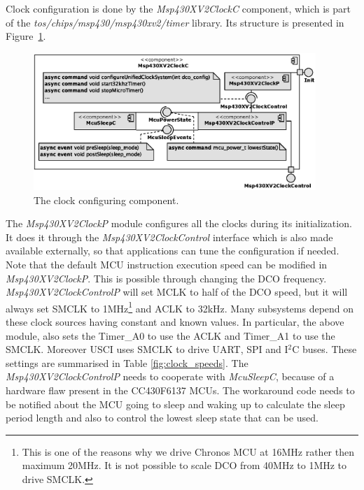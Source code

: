 Clock configuration is done by the \emph{Msp430XV2ClockC} component, which is part of the \emph{tos/chips/msp430/msp430xv2/timer} library. Its structure is presented in Figure~\ref{fig:Msp430XV2ClockC}.
\begin{figure}[h]
  \centering
  \includegraphics[width=0.95\textwidth]{diagrams/Msp430XV2ClockC.eps}
  \caption{The clock configuring component.}
  \label{fig:Msp430XV2ClockC}
\end{figure}
The \emph{Msp430XV2ClockP} module configures all the clocks during its initialization. It does it through the \emph{Msp430XV2ClockControl} interface which is also made available externally, so that applications can tune the configuration if needed. Note that the default MCU instruction execution speed can be modified in \emph{Msp430XV2ClockP}. This is possible through changing the DCO frequency. \emph{Msp430XV2ClockControlP} will set MCLK to half of the DCO speed, but it will always set SMCLK to 1MHz\footnote{This is one of the reasons why we drive Chronos MCU at 16MHz rather then maximum 20MHz. It is not possible to scale DCO from 40MHz to 1MHz to drive SMCLK.} and ACLK to 32kHz. Many subsystems depend on these clock sources having constant and known values. In particular, the above module, also sets the Timer\_A0 to use the ACLK and Timer\_A1 to use the SMCLK. Moreover USCI uses SMCLK to drive UART, SPI and I$^2$C buses. These settings are summarised in Table \ref{fig:clock_speeds}.
The \emph{Msp430XV2ClockControlP} needs to cooperate with \emph{McuSleepC}, because of a hardware flaw present in the CC430F6137 MCUs. The workaround code needs to be notified about the MCU going to sleep and waking up to calculate the sleep period length and also to control the lowest sleep state that can be used.
